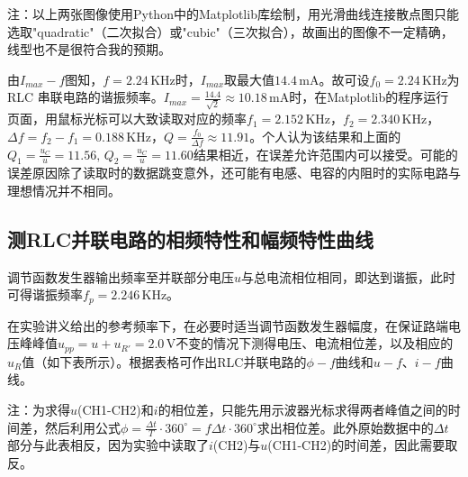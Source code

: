 \documentclass[12pt]{article}
\begin{document}
注：以上两张图像使用Python中的Matplotlib库绘制，用光滑曲线连接散点图只能选取"quadratic"（二次拟合）或"cubic"（三次拟合），故画出的图像不一定精确，线型也不是很符合我的预期。

由$I_{max}-f$图知，$f=2.24\,\mathrm{KHz}$时，$I_{max}$取最大值$14.4\,\mathrm{mA}$。故可设$f_0=2.24\,\mathrm{KHz}$为RLC
串联电路的谐振频率。$I_{max}=\frac{14.4}{\sqrt{2}}\approx10.18\,\mathrm{mA}$时，在Matplotlib的程序运行页面，用鼠标光标可以大致读取对应的频率$f_1=2.152\,\mathrm{KHz}$，$f_2=2.340\,\mathrm{KHz}$，$\Delta f=f_2-f_1=0.188\,\mathrm{KHz}$，$Q=\frac{f_0}{\Delta f}\approx 11.91$。个人认为该结果和上面的$Q_1=\frac{u_C}{u}=11.56,\, Q_2=\frac{u_C}{u}=11.60$结果相近，在误差允许范围内可以接受。可能的误差原因除了读取时的数据跳变意外，还可能有电感、电容的内阻时的实际电路与理想情况并不相同。

\subsection{测RLC并联电路的相频特性和幅频特性曲线}
调节函数发生器输出频率至并联部分电压$ u $与总电流相位相同，即达到谐振，此时可得谐振频率$f_p=2.246\,\mathrm{KHz}$。

在实验讲义给出的参考频率下，在必要时适当调节函数发生器幅度，在保证路端电压峰峰值$ u_{pp}=u+u_{R'}=2.0\,\mathrm V $不变的情况下测得电压、电流相位差，以及相应的$ u_R $值（如下表所示）。根据表格可作出RLC并联电路的$\phi-f$曲线和$u-f$、$i-f$曲线。

注：为求得$u$(CH1-CH2)和$i$的相位差，只能先用示波器光标求得两者峰值之间的时间差，然后利用公式$\phi=\frac{\Delta t}{T}\cdot360^{\circ}=f\Delta t\cdot360^{\circ}$求出相位差。此外原始数据中的$\Delta t$部分与此表相反，因为实验中读取了$i$(CH2)与$u$(CH1-CH2)的时间差，因此需要取反。
\end{document}
